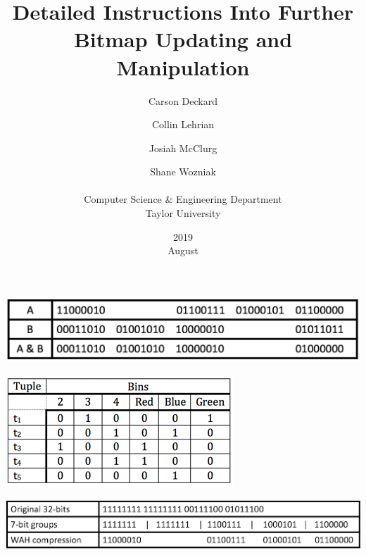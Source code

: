 \documentclass{article}
\title{Detailed Instructions Into Further Bitmap Updating and Manipulation}
\date{2019 \\ August }
\author{Carson Deckard \and Collin Lehrian \and Josiah McClurg \and Shane Wozniak \\ \\ Computer Science \&  Engineering Department \\ Taylor University}
\def \bigw {0.9\columnwidth}
\def \smallw {0.5\columnwidth}
\begin{document}
\maketitle

\includegraphics[width=\bigw]{AandB}

\includegraphics[width=\smallw]{bitmap}

\includegraphics[width=\bigw]{wahcompression}
%
%
\end{document}
